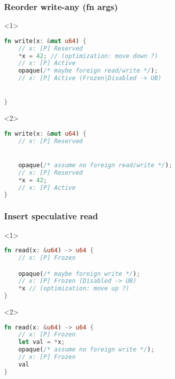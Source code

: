 \begin{frame}[fragile, t]
    \frametitle{{\cmark} Reorder write-any (fn args)}
    \begin{onlyenv}<1>
        \begin{block}{}
            \begin{lstlisting}[language=rust, escapechar=@]
fn write(x: &mut u64) {
    // x: [P] Reserved
    *x = 42; // (optimization: move down ?)
    // x: [P] Active
    opaque(/* maybe foreign read/write */);
    // x: [P] Active (Frozen|Disabled -> UB)


}
            \end{lstlisting}
        \end{block}
    \end{onlyenv}
    \begin{onlyenv}<2>
        \begin{block}{}
            \begin{lstlisting}[language=rust, escapechar=@]
fn write(x: &mut u64) {
    // x: [P] Reserved


    opaque(/* assume no foreign read/write */);
    // x: [P] Reserved
    *x = 42;
    // x: [P] Active
}
            \end{lstlisting}
        \end{block}
    \end{onlyenv}
\end{frame}

\begin{frame}[fragile, t]
    \frametitle{{\cmark} Insert speculative read}
    \begin{onlyenv}<1>
        \begin{block}{}
            \begin{lstlisting}[language=rust]
fn read(x: &u64) -> u64 {
    // x: [P] Frozen

    opaque(/* maybe foreign write */);
    // x: [P] Frozen (Disabled -> UB)
    *x // (optimization: move up ?)
}
            \end{lstlisting}
        \end{block}
    \end{onlyenv}

    \begin{onlyenv}<2>
        \begin{block}{}
            \begin{lstlisting}[language=rust]
fn read(x: &u64) -> u64 {
    // x: [P] Frozen
    let val = *x;
    opaque(/* assume no foreign write */);
    // x: [P] Frozen
    val
}
            \end{lstlisting}
        \end{block}
    \end{onlyenv}
\end{frame}

